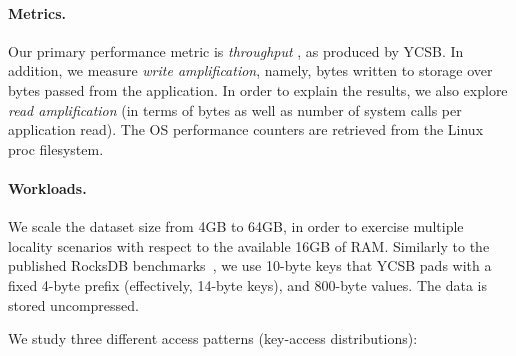 \paragraph{Metrics.} Our primary performance metric is \emph{throughput} 
, 
as produced by YCSB. 
In addition, we measure \emph{write amplification}, namely, bytes written to storage over bytes passed from the application. 
In order to explain the results, we also explore \emph{read amplification} (in terms of bytes as well as number of system calls per application read).  
The OS performance counters are retrieved from the Linux proc filesystem. 

\paragraph{Workloads.} 
We scale the dataset size from 4GB to 64GB, in order to exercise multiple locality 
scenarios with respect to the available 16GB of RAM. Similarly to the published RocksDB benchmarks~\cite{rocsdb-benchmarks}, we use 
10-byte keys that YCSB pads with a fixed 4-byte prefix (effectively, 14-byte keys), and 800-byte values. 
The data is stored uncompressed. 

We study three different access patterns (key-access distributions):  

